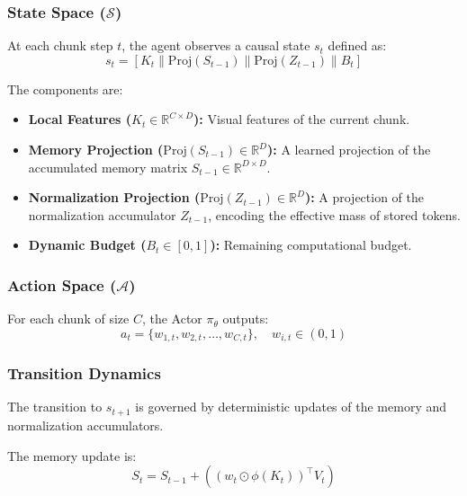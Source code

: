 \subsubsection{State Space ($\mathcal{S}$)}
At each chunk step $t$, the agent observes a causal state $s_t$ defined as:
\begin{equation}
s_t = \left[ K_t \parallel \mathrm{Proj}(S_{t-1}) \parallel \mathrm{Proj}(Z_{t-1}) \parallel B_t \right]
\end{equation}

The components are:
\begin{itemize}
    \item \textbf{Local Features ($K_t \in \mathbb{R}^{C \times D}$):} Visual features of the current chunk.
    
    \item \textbf{Memory Projection ($\mathrm{Proj}(S_{t-1}) \in \mathbb{R}^{D}$):} A learned projection of the accumulated memory matrix $S_{t-1} \in \mathbb{R}^{D \times D}$.
    
    \item \textbf{Normalization Projection ($\mathrm{Proj}(Z_{t-1}) \in \mathbb{R}^{D}$):} A projection of the normalization accumulator $Z_{t-1}$, encoding the effective mass of stored tokens.
    
    \item \textbf{Dynamic Budget ($B_t \in [0,1]$):} Remaining computational budget.
\end{itemize}

\subsubsection{Action Space ($\mathcal{A}$)}
For each chunk of size $C$, the Actor $\pi_\theta$ outputs:
\begin{equation}
a_t = \{ w_{1,t}, w_{2,t}, \dots, w_{C,t} \}, \quad w_{i,t} \in (0,1)
\end{equation}
\subsubsection{Transition Dynamics}
The transition to $s_{t+1}$ is governed by deterministic updates of the memory and normalization accumulators.

The memory update is:
\begin{equation}
S_t = S_{t-1} + \left( (w_t \odot \phi(K_t))^\top V_t \right)
\end{equation}

